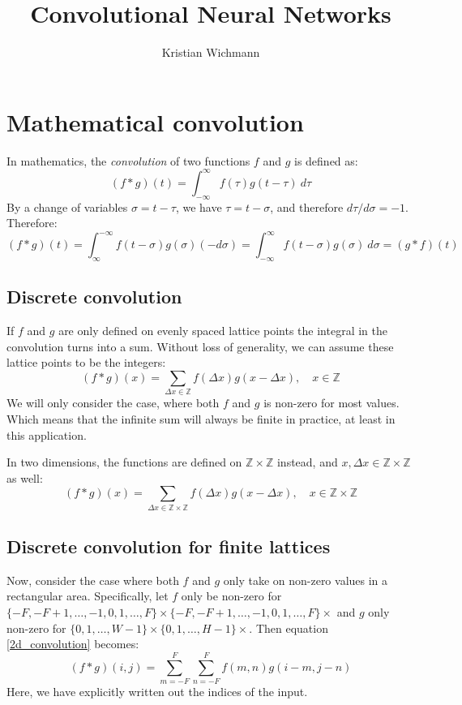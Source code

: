 \documentclass[12pt, a4paper]{article}
\title{Convolutional Neural Networks}
\author{Kristian Wichmann}
\numberwithin{equation}{section}
\begin{document}
\maketitle

\section{Mathematical convolution}
In mathematics, the \textit{convolution} of two functions $f$ and $g$ is defined as:
\begin{equation}
(f*g)(t)=\int_{-\infty}^\infty f(\tau)g(t-\tau)\ d\tau
\end{equation}
By a change of variables $\sigma=t-\tau$, we have $\tau=t-\sigma$, and therefore $d\tau/d\sigma=-1$. Therefore:
\begin{equation}
(f*g)(t)=\int_\infty^{-\infty}f(t-\sigma)g(\sigma)(-d\sigma)=\int_{-\infty}^\infty f(t-\sigma)g(\sigma)\ d\sigma=(g*f)(t)
\end{equation}

\subsection{Discrete convolution}
If $f$ and $g$ are only defined on evenly spaced lattice points the integral in the convolution turns into a sum. Without loss of generality, we can assume these lattice points to be the integers:
\begin{equation}
(f*g)(x)=\sum_{\Delta x\in\mathbb{Z}}f(\Delta x)g(x-\Delta x),\quad x\in\mathbb{Z}
\end{equation}
We will only consider the case, where both $f$ and $g$ is non-zero for most values. Which means that the infinite sum will always be finite in practice, at least in this application.

In two dimensions, the functions are defined on $\mathbb{Z}\times\mathbb{Z}$ instead, and $x,\Delta x\in\mathbb{Z}\times\mathbb{Z}$ as well:
\begin{equation}
(f*g)(x)=\sum_{\Delta x\in\mathbb{Z}\times\mathbb{Z}}f(\Delta x)g(x-\Delta x),\quad x\in\mathbb{Z}\times\mathbb{Z}
\label{2d_convolution}
\end{equation}

\subsection{Discrete convolution for finite lattices}
Now, consider the case where both $f$ and $g$ only take on non-zero values in a rectangular area. Specifically, let $f$ only be non-zero for $\{-F,-F+1,\ldots,-1,0,1,\ldots,F\}\times\{-F,-F+1,\ldots,-1,0,1,\ldots,F\}\times$ and $g$ only non-zero for $\{0,1,\ldots,W-1\}\times\{0,1,\ldots,H-1\}\times$. Then equation \ref{2d_convolution} becomes:
\begin{equation}
(f*g)(i,j)=\sum_{m=-F}^F\sum_{n=-F}^F f(m,n)g(i-m,j-n)
\label{finite_2d_convolution}
\end{equation}
Here, we have explicitly written out the indices of the input.
\end{document}
